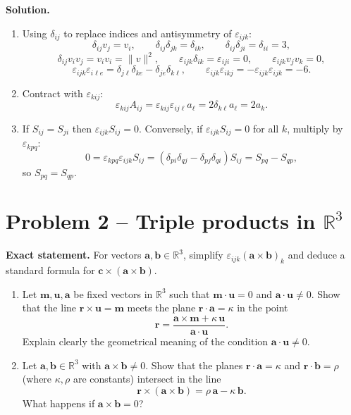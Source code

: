 \documentclass[12pt,a4paper]{article}
\theoremstyle{plain}
\theoremstyle{definition}      %
\begin{document}
\textbf{Solution.}
\begin{enumerate}[label=(\alph*)]
	\item Using $\delta_{ij}$ to replace indices and antisymmetry of $\varepsilon_{ijk}$:
	\[
	\delta_{ij}v_j=v_i,\qquad
	\delta_{ij}\delta_{jk}=\delta_{ik},\qquad
	\delta_{ij}\delta_{ji}=\delta_{ii}=3,
	\]
	\[
	\delta_{ij}v_iv_j=v_iv_i=\|v\|^2,\qquad
	\varepsilon_{ijk}\delta_{ik}=\varepsilon_{iji}=0,\qquad
	\varepsilon_{ijk}v_jv_k=0,
	\]
	\[
	\varepsilon_{ijk}\varepsilon_{i\ell e}=\delta_{j\ell}\delta_{ke}-\delta_{je}\delta_{k\ell},\qquad
	\varepsilon_{ijk}\varepsilon_{ikj}=-\varepsilon_{ijk}\varepsilon_{ijk}=-6.
	\]
	\item Contract with $\varepsilon_{kij}$:
	\[
	\varepsilon_{kij}A_{ij}
	=\varepsilon_{kij}\varepsilon_{ij\ell}a_\ell
	=2\delta_{k\ell}a_\ell
	=2a_k.
	\]
	\item If $S_{ij}=S_{ji}$ then $\varepsilon_{ijk}S_{ij}=0$. Conversely, if $\varepsilon_{ijk}S_{ij}=0$ for all $k$, multiply by $\varepsilon_{kpq}$:
	\[
	0=\varepsilon_{kpq}\varepsilon_{ijk}S_{ij}
	=(\delta_{pi}\delta_{qj}-\delta_{pj}\delta_{qi})S_{ij}
	=S_{pq}-S_{qp},
	\]
	so $S_{pq}=S_{qp}$.
\end{enumerate}

\section*{Problem 2 -- Triple products in $\mathbb{R}^3$}

\textbf{Exact statement.}
For vectors $\mathbf a,\mathbf b\in\mathbb R^3$, simplify $\varepsilon_{ijk}(\mathbf a\times\mathbf b)_k$ and deduce a standard formula for $\mathbf c\times(\mathbf a\times\mathbf b)$.
\begin{enumerate}[label=(\alph*)]
	\item Let $\mathbf m,\mathbf u,\mathbf a$ be fixed vectors in $\mathbb R^3$ such that $\mathbf m\cdot\mathbf u=0$ and $\mathbf a\cdot\mathbf u\neq 0$.
	Show that the line $\mathbf r\times\mathbf u=\mathbf m$ meets the plane $\mathbf r\cdot\mathbf a=\kappa$ in the point
	\[
	\mathbf r=\frac{\mathbf a\times\mathbf m+\kappa\,\mathbf u}{\mathbf a\cdot\mathbf u}.
	\]
	Explain clearly the geometrical meaning of the condition $\mathbf a\cdot\mathbf u\neq 0$.
	\item Let $\mathbf a,\mathbf b\in\mathbb R^3$ with $\mathbf a\times\mathbf b\neq 0$.
	Show that the planes $\mathbf r\cdot\mathbf a=\kappa$ and $\mathbf r\cdot\mathbf b=\rho$ (where $\kappa,\rho$ are constants) intersect in the line
	\[
	\mathbf r\times(\mathbf a\times\mathbf b)=\rho\,\mathbf a-\kappa\,\mathbf b.
	\]
	What happens if $\mathbf a\times\mathbf b=0$?
\end{enumerate}
\end{document}
